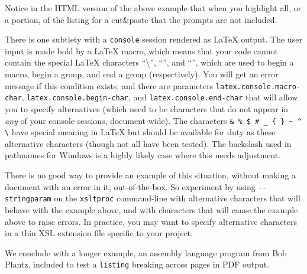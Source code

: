 \documentclass[10pt,]{article}
\theoremstyle{plain}
\theoremstyle{definition}
\theoremstyle{definition}
\theoremstyle{definition}
\theoremstyle{definition}
\theoremstyle{definition}
\theoremstyle{definition}
\numberwithin{equation}{section}
\begin{document}
\hypertarget{p-637}{}%
Notice in the HTML version of the above example that when you highlight all, or a portion, of the listing for a cut\&paste that the prompts are not included.%
\par
\hypertarget{p-638}{}%
There is one subtlety with a \lstinline?console? session rendered as \LaTeX{} output.  The user input is made bold by a \LaTeX{} macro, which means that your code cannot contain the special \LaTeX{} characters ``\textbackslash{}'', ``\textbraceleft{}'', and ``\textbraceright{}'', which are used to begin a macro, begin a group, and end a group (respectively).  You will get an error message if this condition exists, and there are parameters \lstinline?latex.console.macro-char?, \lstinline?latex.console.begin-char?, and \lstinline?latex.console.end-char? that will allow you to specify alternatives (which need to be characters that do not appear in \emph{any} of your console sessions, document-wide).  The characters \lstinline?& % $ # _ { } ~ ^ \? have special meaning in \LaTeX{} but should be available for duty as these alternative characters (though not all have been tested).  The backslash used in pathnames for Windows is a highly likely case where this needs adjustment.%
\par
\hypertarget{p-639}{}%
There is no good way to provide an example of this situation, without making a document with an error in it, out-of-the-box.  So experiment by using \lstinline?--stringparam? on the \lstinline?xsltproc? command-line with alternative characters that will behave with the example above, and with characters that will cause the example above to raise errors.  In practice, you may want to specify alternative characters in a thin XSL extension file specific to your project.%
\par
\hypertarget{p-640}{}%
We conclude with a longer example, an assembly language program from Bob Plantz, included to test a \lstinline?listing? breaking across pages in PDF output.%
\end{document}
